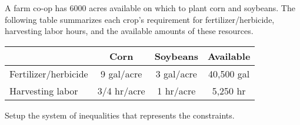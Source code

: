 \documentclass[../mathNotesPreamble]{subfiles}
\begin{document}
  \begin{center}
  \end{center}
  \begin{ex*}
    A farm co-op has 6000 acres available on which to plant corn and soybeans. The following table summarizes each crop's requirement for fertilizer/herbicide, harvesting labor hours, and the available amounts of these resources.
    \begin{center}
      \begin{tabular}{@{}lccc@{}}\toprule
        & \textbf{Corn}& \textbf{Soybeans}& \textbf{Available}\\\midrule
        Fertilizer/herbicide& 9 gal/acre& 3 gal/acre& 40,500 gal\\
        Harvesting labor& 3/4 hr/acre& 1 hr/acre& 5,250 hr\\\bottomrule
      \end{tabular}
    \end{center}
    Setup the system of inequalities that represents the constraints.
  \end{ex*}
  
\end{document}
